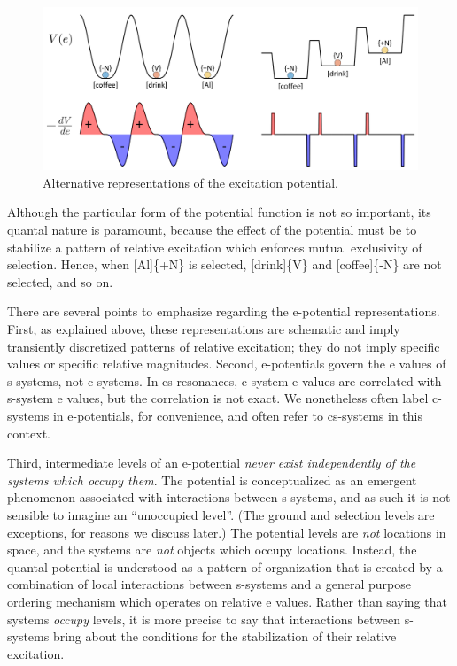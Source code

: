   
\begin{figure}
\includegraphics[width=\textwidth]{figures/Tilsen-img24.png}
\caption{Alternative representations of the excitation potential.}
\label{fig:2:17}
\end{figure}
 

  Although the particular form of the potential function is not so important, its quantal nature is paramount, because the effect of the potential must be to stabilize a pattern of relative excitation which enforces mutual exclusivity of selection. Hence, when [Al]\{+N\} is selected, [drink]\{V\} and [coffee]\{-N\} are not selected, and so on. 

  There are several points to emphasize regarding the e-potential representations. First, as explained above, these representations are schematic and imply transiently discretized patterns of relative excitation; they do not imply specific values or specific relative magnitudes. Second, e-potentials govern the e values of s-systems, not c-systems. In cs-resonances, c-system e values are correlated with s-system e values, but the correlation is not exact. We nonetheless often label c-systems in e-potentials, for convenience, and often refer to cs-systems in this context. 

  Third, intermediate levels of an e-potential \textit{never exist independently of the systems which occupy them}. The potential is conceptualized as an emergent phenomenon associated with interactions between s-systems, and as such it is not sensible to imagine an “unoccupied level”. (The ground and selection levels are exceptions, for reasons we discuss later.) The potential levels are \textit{not} locations in space, and the systems are \textit{not} objects which occupy locations. Instead, the quantal potential is understood as a pattern of organization that is created by a combination of local interactions between s-systems and a general purpose ordering mechanism which operates on relative e values. Rather than saying that systems \textit{occupy} levels, it is more precise to say that interactions between s-systems bring about the conditions for the stabilization of their relative excitation.


